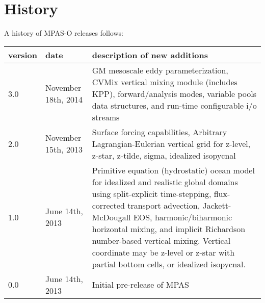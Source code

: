 \chapter*{History}
\label{chap:history}

A history of MPAS-O releases follows: \\


\begin{tabular}{ll p{4in}} 
\hline\hline version & date & description of new additions  \\
\hline 
3.0 & November 18th, 2014 & 
GM mesoscale eddy parameterization, CVMix vertical mixing module (includes KPP), forward/analysis modes, variable pools data structures, and run-time configurable i/o streams \\
\hline 
2.0 & November 15th, 2013 & 
Surface forcing capabilities, Arbitrary Lagrangian-Eulerian vertical grid for z-level, z-star, z-tilde, sigma, idealized isopycnal \\
\hline 
1.0 & June 14th, 2013 & Primitive equation (hydrostatic) ocean model for idealized and realistic global domains using split-explicit time-stepping, flux-corrected transport advection, Jackett-McDougall EOS, harmonic/biharmonic horizontal mixing, and implicit Richardson number-based vertical mixing.  Vertical coordinate may be z-level or z-star with partial bottom cells, or idealized isopycnal. \\
\hline 
0.0 & June 14th, 2013 & Initial pre-release of MPAS \\
\hline 
\end{tabular} 



\newpage
